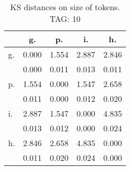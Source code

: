 \begin{table}[h!]
\begin{center}
\begin{tabular}{| l | c | c | c | c |}\hline
 & g. & p. & i. & h. \\\hline
g. & 0.000  & 1.554  & 2.887  & 2.846 \\\hline
 & 0.000  & 0.011  & 0.013  & 0.011 \\\hline
p. & 1.554  & 0.000  & 1.547  & 2.658 \\\hline
 & 0.011  & 0.000  & 0.012  & 0.020 \\\hline
i. & 2.887  & 1.547  & 0.000  & 4.835 \\\hline
 & 0.013  & 0.012  & 0.000  & 0.024 \\\hline
h. & 2.846  & 2.658  & 4.835  & 0.000 \\\hline
 & 0.011  & 0.020  & 0.024  & 0.000 \\\hline
\end{tabular}
\caption{KS distances on size of tokens. TAG: 10}
\end{center}
\end{table}